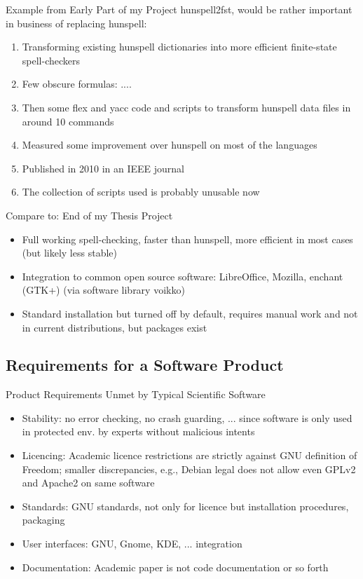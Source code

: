 \documentclass[t,12pt]{beamer}
\begin{document}
\begin{frame}{Example from Early Part of my Project}
    hunspell2fst, would be rather important in business of replacing hunspell:
    \begin{enumerate}
        \item Transforming existing hunspell dictionaries into more efficient
            finite-state spell-checkers
        \item Few obscure formulas: ....
        \item Then some flex and yacc code and scripts
            to transform hunspell data files in around 10 commands
        \item Measured some improvement over hunspell on most of the languages
        \item Published in 2010 in an IEEE journal
        \item The collection of scripts used is probably unusable now
    \end{enumerate}
\end{frame}


\begin{frame}{Compare to: End of my Thesis Project}
    \begin{itemize}
        \item Full working spell-checking, faster than hunspell, more efficient
            in most cases (but likely less stable)
        \item Integration to common open source software: LibreOffice,
            Mozilla, enchant (GTK+) (via software library voikko)
        \item Standard installation but turned off by default, requires manual
            work and not in current distributions, but packages exist
    \end{itemize}
\end{frame}

\subsection{Requirements for a Software Product}

\begin{frame}{Product Requirements Unmet by Typical Scientific Software}
    \begin{itemize}
        \item Stability: no error checking, no crash guarding, ... since software
            is only used in protected env. by experts without malicious intents
        \item Licencing: Academic licence restrictions are strictly against
            GNU definition of Freedom; smaller discrepancies, e.g., Debian legal
            does not allow even GPLv2 and Apache2 on same software
        \item Standards: GNU standards, not only for licence but installation
            procedures, packaging
        \item User interfaces: GNU, Gnome, KDE, ... integration
        \item Documentation: Academic paper is not code documentation or so 
            forth 
    \end{itemize}
\end{frame}
\end{document}
